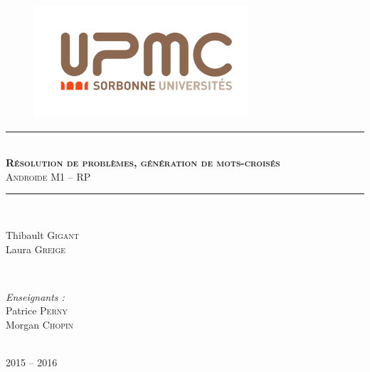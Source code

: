 \documentclass[11pt, letterpaper]{article}
\newcommand{\hmark}{\rule{\linewidth}{0.5mm}}
\begin{document}
\begin{titlepage}

\centering

\begin{figure}[t]
\begin{center}
\includegraphics[width=8cm]{upmc.png}
\end{center}
\end{figure}

\hmark \\[0.5cm]
\textsc{\textbf{\Large R\'{e}solution de probl\`{e}mes, g\'{e}n\'{e}ration de mots-crois\'{e}s}} \\[0.5cm]
\textsc{Androide M1 -- RP} \\[0.5cm]
\hmark \\[5cm]

\begin{minipage}{0.4\textwidth}
\begin{flushleft}
Thibault \textsc{Gigant} \\
Laura \textsc{Greige}
\end{flushleft}
\end{minipage}
~
\begin{minipage}{0.4\textwidth}
\begin{flushright}
\emph{Enseignants :}\\[0.5cm]
Patrice \textsc{Perny} \\
Morgan \textsc{Chopin}
\end{flushright}
\end{minipage}\\[4cm]

\large 2015 -- 2016

\end{titlepage}
\newpage

\tableofcontents

\newpage


\pagestyle{fancy}
\renewcommand{\headrulewidth}{1pt}
\rhead{}
\end{document}
